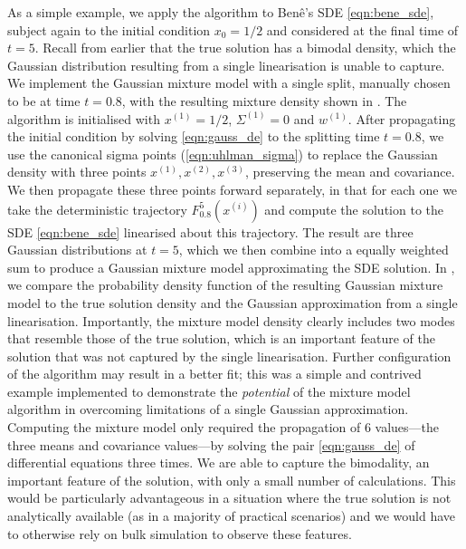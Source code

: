 As a simple example, we apply the algorithm to Ben\^e's SDE \cref{eqn:bene_sde}, subject again to the initial condition \(x_0 = 1/2\) and considered at the final time of \(t = 5\).
Recall from earlier that the true solution has a bimodal density, which the Gaussian distribution resulting from a single linearisation is unable to capture.
We implement the Gaussian mixture model with a single split, manually chosen to be at time \(t = 0.8\), with the resulting mixture density shown in .
The algorithm is initialised with \(x^{(1)} = 1/2\), \(\Sigma^{(1)} = 0\) and \(w^{(1)}\).
After propagating the initial condition by solving \cref{eqn:gauss_de} to the splitting time \(t = 0.8\), we use the canonical sigma points (\cref{eqn:uhlman_sigma}) to replace the Gaussian density with three points \(x^{(1)}, x^{(2)}, x^{(3)}\), preserving the mean and covariance.
We then propagate these three points forward separately, in that for each one we take the deterministic trajectory \(F_{0.8}^{5}\!\left(x^{(i)}\right)\) and compute the solution to the SDE \cref{eqn:bene_sde} linearised about this trajectory.
The result are three Gaussian distributions at \(t = 5\), which we then combine into a equally weighted sum to produce a Gaussian mixture model approximating the SDE solution.
In , we compare the probability density function of the resulting Gaussian mixture model to the true solution density and the Gaussian approximation from a single linearisation.
Importantly, the mixture model density clearly includes two modes that resemble those of the true solution, which is an important feature of the solution that was not captured by the single linearisation.
Further configuration of the algorithm may result in a better fit; this was a simple and contrived example implemented to demonstrate the \emph{potential} of the mixture model algorithm in overcoming limitations of a single Gaussian approximation.
Computing the mixture model only required the propagation of 6 values---the three means and covariance values---by solving the pair \cref{eqn:gauss_de} of differential equations three times.
We are able to capture the bimodality, an important feature of the solution, with only a small number of calculations.
This would be particularly advantageous in a situation where the true solution is not analytically available (as in a majority of practical scenarios) and we would have to otherwise rely on bulk simulation to observe these features.


